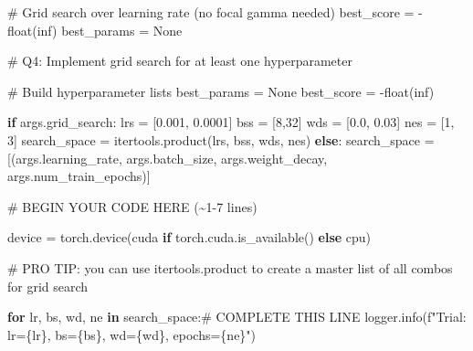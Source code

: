 \documentclass[
  letterpaper,
  DIV=11,
  numbers=noendperiod]{scrartcl}
\newenvironment{Shaded}{\begin{snugshade}}{\end{snugshade}}
\newcommand{\BuiltInTok}[1]{\textcolor[rgb]{0.00,0.23,0.31}{#1}}
\newcommand{\CommentTok}[1]{\textcolor[rgb]{0.37,0.37,0.37}{#1}}
\newcommand{\ControlFlowTok}[1]{\textcolor[rgb]{0.00,0.23,0.31}{\textbf{#1}}}
\newcommand{\DecValTok}[1]{\textcolor[rgb]{0.68,0.00,0.00}{#1}}
\newcommand{\FloatTok}[1]{\textcolor[rgb]{0.68,0.00,0.00}{#1}}
\newcommand{\KeywordTok}[1]{\textcolor[rgb]{0.00,0.23,0.31}{\textbf{#1}}}
\newcommand{\NormalTok}[1]{\textcolor[rgb]{0.00,0.23,0.31}{#1}}
\newcommand{\OperatorTok}[1]{\textcolor[rgb]{0.37,0.37,0.37}{#1}}
\newcommand{\RegionMarkerTok}[1]{\textcolor[rgb]{0.00,0.23,0.31}{#1}}
\newcommand{\SpecialCharTok}[1]{\textcolor[rgb]{0.37,0.37,0.37}{#1}}
\newcommand{\SpecialStringTok}[1]{\textcolor[rgb]{0.13,0.47,0.30}{#1}}
\newcommand{\StringTok}[1]{\textcolor[rgb]{0.13,0.47,0.30}{#1}}
\newcommand{\VariableTok}[1]{\textcolor[rgb]{0.07,0.07,0.07}{#1}}
\begin{document}
\begin{Shaded}
\begin{Highlighting}[]
    \CommentTok{\# Grid search over learning rate (no focal gamma needed)}
\NormalTok{    best\_score }\OperatorTok{=} \OperatorTok{{-}}\BuiltInTok{float}\NormalTok{(}\StringTok{\textquotesingle{}inf\textquotesingle{}}\NormalTok{)}
\NormalTok{    best\_params }\OperatorTok{=} \VariableTok{None}

    \CommentTok{\# Q4: Implement grid search for at least one hyperparameter}

    \CommentTok{\# Build hyperparameter lists}
\NormalTok{    best\_params }\OperatorTok{=} \VariableTok{None}
\NormalTok{    best\_score }\OperatorTok{=} \OperatorTok{{-}}\BuiltInTok{float}\NormalTok{(}\StringTok{\textquotesingle{}inf\textquotesingle{}}\NormalTok{)}

    \ControlFlowTok{if}\NormalTok{ args.grid\_search:}
\NormalTok{        lrs }\OperatorTok{=}\NormalTok{ [}\FloatTok{0.001}\NormalTok{, }\FloatTok{0.0001}\NormalTok{]}
\NormalTok{        bss }\OperatorTok{=}\NormalTok{ [}\DecValTok{8}\NormalTok{,}\DecValTok{32}\NormalTok{]}
\NormalTok{        wds }\OperatorTok{=}\NormalTok{ [}\FloatTok{0.0}\NormalTok{, }\FloatTok{0.03}\NormalTok{]}
\NormalTok{        nes }\OperatorTok{=}\NormalTok{ [}\DecValTok{1}\NormalTok{, }\DecValTok{3}\NormalTok{]}
\NormalTok{        search\_space }\OperatorTok{=}\NormalTok{ itertools.product(lrs, bss, wds, nes)}
    \ControlFlowTok{else}\NormalTok{:}
\NormalTok{        search\_space }\OperatorTok{=}\NormalTok{ [(args.learning\_rate, args.batch\_size, args.weight\_decay, args.num\_train\_epochs)]}

    \CommentTok{\# }\RegionMarkerTok{BEGIN}\CommentTok{ YOUR CODE HERE (\textasciitilde{}1{-}7 lines)}


\NormalTok{    device }\OperatorTok{=}\NormalTok{ torch.device(}\StringTok{\textquotesingle{}cuda\textquotesingle{}} \ControlFlowTok{if}\NormalTok{ torch.cuda.is\_available() }\ControlFlowTok{else} \StringTok{\textquotesingle{}cpu\textquotesingle{}}\NormalTok{)}


    \CommentTok{\# PRO TIP: you can use itertools.product to create a master list of all combos for grid search}

    \ControlFlowTok{for}\NormalTok{ lr, bs, wd, ne }\KeywordTok{in}\NormalTok{ search\_space:}\CommentTok{\# COMPLETE THIS LINE}
\NormalTok{        logger.info(}\SpecialStringTok{f"Trial: lr=}\SpecialCharTok{\{}\NormalTok{lr}\SpecialCharTok{\}}\SpecialStringTok{, bs=}\SpecialCharTok{\{}\NormalTok{bs}\SpecialCharTok{\}}\SpecialStringTok{, wd=}\SpecialCharTok{\{}\NormalTok{wd}\SpecialCharTok{\}}\SpecialStringTok{, epochs=}\SpecialCharTok{\{}\NormalTok{ne}\SpecialCharTok{\}}\SpecialStringTok{"}\NormalTok{)}


\end{Highlighting}
\end{Shaded}
\end{document}
